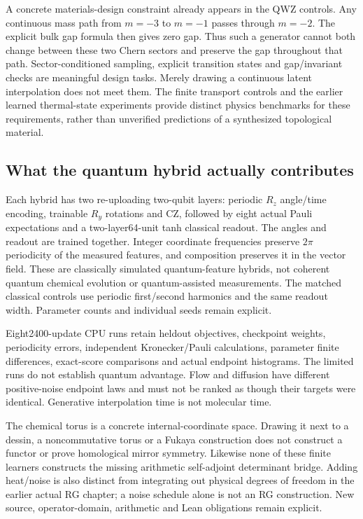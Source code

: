 A concrete materials-design constraint already appears in the QWZ controls.
Any continuous mass path from $m=-3$ to $m=-1$ passes through $m=-2$.
The explicit bulk gap formula then gives zero gap. Thus such a generator
cannot both change between these two Chern sectors and preserve the gap
throughout that path. Sector-conditioned sampling, explicit transition
states and gap/invariant checks are meaningful design tasks. Merely drawing
a continuous latent interpolation does not meet them. The finite transport
controls and the earlier learned thermal-state experiments provide distinct
physics benchmarks for these requirements, rather than unverified
predictions of a synthesized topological material.

\subsection{What the quantum hybrid actually contributes}
Each hybrid has two re-uploading two-qubit layers: periodic $R_z$ angle/time
encoding, trainable $R_y$ rotations and CZ, followed by eight actual Pauli
expectations and a two-layer64-unit tanh classical readout. The angles and
readout are trained together. Integer coordinate frequencies preserve
$2\pi$ periodicity of the measured features, and composition preserves it in
the vector field. These are classically simulated quantum-feature hybrids,
not coherent quantum chemical evolution or quantum-assisted measurements.
The matched classical controls use periodic first/second harmonics and the
same readout width. Parameter counts and individual seeds remain explicit.

Eight2400-update CPU runs retain heldout objectives, checkpoint weights,
periodicity errors, independent Kronecker/Pauli calculations, parameter
finite differences, exact-score comparisons and actual endpoint histograms.
The limited runs do not establish quantum advantage. Flow and diffusion have
different positive-noise endpoint laws and must not be ranked as though their
targets were identical. Generative interpolation time is not molecular time.

The chemical torus is a concrete internal-coordinate space. Drawing it next
to a dessin, a noncommutative torus or a Fukaya construction does not construct
a functor or prove homological mirror symmetry. Likewise none of these finite
learners constructs the missing arithmetic self-adjoint determinant bridge.
Adding heat/noise is also distinct from integrating out physical degrees of
freedom in the earlier actual RG chapter; a noise schedule alone is not an RG
construction. New source, operator-domain, arithmetic and Lean obligations remain explicit.
